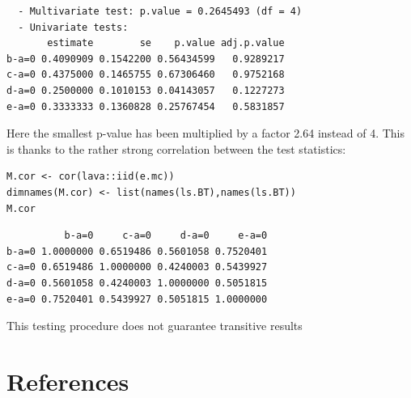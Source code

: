 \documentclass[12pt]{article}
\newcommand\Warning[1][3ex]{%
\renewcommand\stacktype{L}%
\scaleto{\stackon[1.3pt]{\color{red}$\triangle$}{\tiny\bfseries !}}{#1}%
\xspace
}
\begin{document}
\begin{verbatim}
  - Multivariate test: p.value = 0.2645493 (df = 4)
  - Univariate tests:
       estimate        se    p.value adj.p.value
b-a=0 0.4090909 0.1542200 0.56434599   0.9289217
c-a=0 0.4375000 0.1465755 0.67306460   0.9752168
d-a=0 0.2500000 0.1010153 0.04143057   0.1227273
e-a=0 0.3333333 0.1360828 0.25767454   0.5831857
\end{verbatim}



Here the smallest p-value has been multiplied by a factor 2.64 instead
of 4. This is thanks to the rather strong correlation between the test
statistics:
\lstset{language=r,label= ,caption= ,captionpos=b,numbers=none}
\begin{lstlisting}
M.cor <- cor(lava::iid(e.mc))
dimnames(M.cor) <- list(names(ls.BT),names(ls.BT))
M.cor
\end{lstlisting}

\begin{verbatim}
          b-a=0     c-a=0     d-a=0     e-a=0
b-a=0 1.0000000 0.6519486 0.5601058 0.7520401
c-a=0 0.6519486 1.0000000 0.4240003 0.5439927
d-a=0 0.5601058 0.4240003 1.0000000 0.5051815
e-a=0 0.7520401 0.5439927 0.5051815 1.0000000
\end{verbatim}


\Warning This testing procedure does not guarantee transitive results \citep{thangavelu2007wilcoxon}


\section*{References}
\label{sec:org267c177}
\begingroup
\renewcommand{\section}[2]{}




\endgroup
\end{document}
